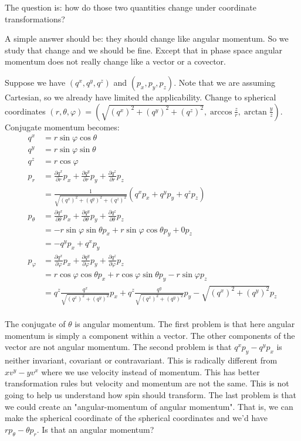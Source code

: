 \documentclass[11pt,letterpaper,fleqn]{memoir} %
\begin{document}
The question is: how do those two quantities change under coordinate transformations?

A simple answer should be: they should change like angular momentum. So we study that change and we should be fine. Except that in phase space angular momentum does not really change like a vector or a covector.

Suppose we have $(q^x, q^y, q^z)$ and $(p_x, p_y, p_z)$. Note that we are assuming Cartesian, so we already have limited the applicability. Change to spherical coordinates $(r,\theta,\varphi) = (\sqrt{(q^x)^2 + (q^y)^2 + (q^z)^2 }, \arccos \frac{z}{r}, \arctan \frac{y}{z})$. Conjugate momentum becomes:
\begin{align*}
	q^x &= r \sin \varphi \cos \theta \\
	q^y &= r \sin \varphi \sin \theta \\
	q^z &= r \cos \varphi \\
	p_r&= \frac{\partial q^x}{\partial r} p_x + \frac{\partial q^y}{\partial r} p_y + \frac{\partial q^z}{\partial r} p_z \\
	&= \frac{1}{\sqrt{(q^x)^2 + (q^y)^2 + (q^z)^2 }} (q^x p_x + q^y p_y + q^z p_z) \\
	p_\theta&= \frac{\partial q^x}{\partial \theta} p_x + \frac{\partial q^y}{\partial \theta} p_y + \frac{\partial q^z}{\partial \theta} p_z \\
	&= - r \sin \varphi \sin \theta p_x + r \sin \varphi \cos \theta p_y + 0 p_z \\
	&= - q^y p_x + q^x p_y \\
	p_\varphi&= \frac{\partial q^x}{\partial \varphi} p_x + \frac{\partial q^y}{\partial \varphi} p_y + \frac{\partial q^z}{\partial \varphi} p_z \\
	&= r \cos \varphi \cos \theta p_x + r \cos \varphi \sin \theta p_y - r \sin \varphi p_z \\
	&= q^z \frac{q^x}{\sqrt{(q^x)^2 + (q^y)^2}} p_x + q^z \frac{q^y}{\sqrt{(q^x)^2 + (q^y)^2}} p_y - \sqrt{(q^x)^2 + (q^y)^2} p_z \\
\end{align*}

The conjugate of $\theta$ is angular momentum. The first problem is that here angular momentum is simply a component within a vector. The other components of the vector are not angular momentum. The second problem is that $q^x p_y - q^y p_x$ is neither invariant, covariant or contravariant. This is radically different from $x v^y - y v^x$ where we use velocity instead of momentum. This has better transformation rules but velocity and momentum are not the same. This is not going to help us understand how spin should transform. The last problem is that we could create an "angular-momentum of angular momentum". That is, we can make the spherical coordinate of the spherical coordinates and we'd have $r p_\theta - \theta p_r$. Is that an angular momentum?
\end{document}
